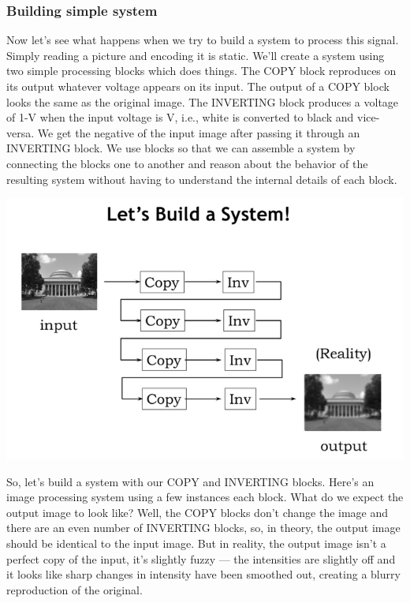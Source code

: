 \documentclass[a4paper,twoside]{article}
\numberwithin{equation}{section}
\begin{document}
\subsubsection{Building simple system}
Now let's see what happens when we try to build a system to process this signal. Simply reading a
picture and encoding it is static. We'll create a system using two simple processing blocks which does
things. The COPY block reproduces on its output whatever voltage appears on its input.
The output of a COPY block looks the same as the original image. The INVERTING block produces a
voltage of 1-V when the input voltage is V, i.e., white is converted to black and vice-versa.
We get the negative of the input image after passing it through an INVERTING block.
We use blocks so that we can assemble a system by connecting the blocks one to another and reason
about the behavior of the resulting system without having to understand the internal details of each block.
\begin{center}
    \includegraphics[scale=0.4]{assets/example_system.png}
\end{center}
So, let's build a system with our COPY and INVERTING blocks. Here's an image processing system
using a few instances each block. What do we expect the output image to look like? Well, the
COPY blocks don't change the image and there are an even number of INVERTING blocks, so, in theory,
the output image should be identical to the input image. But in reality, the output image isn't a
perfect copy of the input, it's slightly fuzzy — the intensities are slightly off and it looks like
sharp changes in intensity have been smoothed out, creating a blurry reproduction of the original.
\end{document}
